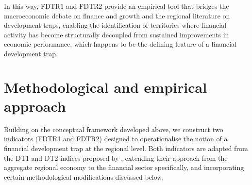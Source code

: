 \documentclass[a4paper,11pt,oneside]{article}
\begin{document}


In this way, FDTR1 and FDTR2 provide an empirical tool that bridges the macroeconomic debate on finance and growth and the regional literature on development traps, enabling the identification of territories where financial activity has become structurally decoupled from sustained improvements in economic performance, which happens to be the defining feature of a financial development trap.



\section{Methodological and empirical approach}
\label{sec:methodology}


Building on the conceptual framework developed above, we construct two indicators (FDTR1 and FDTR2) designed to operationalise the notion of a financial development trap at the regional level. Both indicators are adapted from the DT1 and DT2 indices proposed by \cite{diemer2022regional}, extending their approach from the aggregate regional economy to the financial sector specifically, and incorporating certain methodological modifications discussed below.




\end{document}
